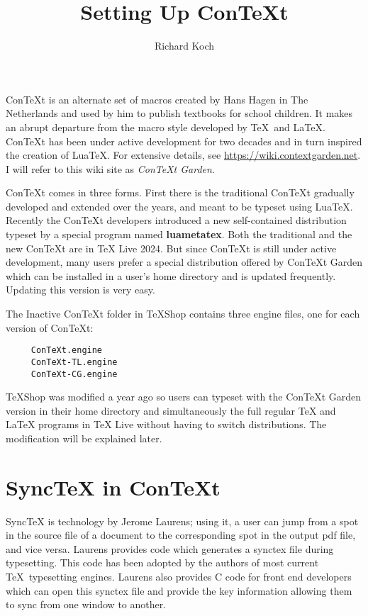 \documentclass[11pt, oneside]{amsart}   	%
\title{Setting Up ConTeXt}
\author{Richard Koch}
\begin{document}
\maketitle

ConTeXt is an alternate set of macros created by Hans Hagen in The Netherlands and used by him to publish textbooks for school children.  It makes an abrupt departure from the macro style developed by \TeX\ and \LaTeX. ConTeXt has been under active development for two decades and in turn inspired the creation of LuaTeX. For extensive details, see \url{https://wiki.contextgarden.net}. I will refer to this wiki site as {\em ConTeXt Garden}.

ConTeXt comes in three forms. First there is the traditional ConTeXt gradually developed and extended over the years, and meant to be typeset using LuaTeX. Recently the ConTeXt developers introduced a new self-contained distribution typeset by a special program named {\bf luametatex}.  Both the traditional and the new ConTeXt are in TeX Live 2024. But since ConTeXt is still under active development, many users prefer a special distribution offered by ConTeXt Garden which can be installed in a user's home directory and is updated frequently. Updating this version is very easy.

The Inactive ConTeXt folder in TeXShop contains three engine files, one for each version of ConTeXt:
\begin{verbatim}
     ConTeXt.engine
     ConTeXt-TL.engine
     ConTeXt-CG.engine
\end{verbatim}

TeXShop was modified a year ago so users can typeset with the ConTeXt Garden version in their home directory and simultaneously the full regular TeX and LaTeX programs in TeX Live without having to switch distributions.
The modification will be explained later.

\section{SyncTeX in ConTeXt}

SyncTeX is technology by Jerome Laurens; using it, a user can jump from a spot in the source file of a document to the corresponding spot in the output pdf file, and vice versa. Laurens provides code which generates a synctex file during typesetting. This code has been adopted by the authors of most current \TeX\ typesetting engines. Laurens also provides C code for front end developers which can open this synctex file and provide the key information allowing them to sync from one window to another.
\end{document}
